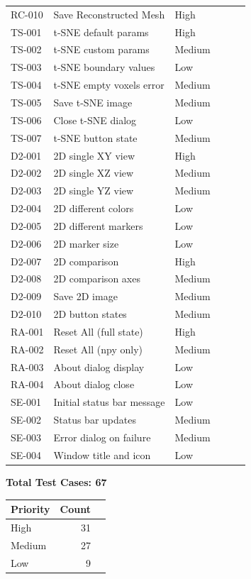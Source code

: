 \documentclass[12pt,a4paper]{article}
\begin{document}
\begin{longtable}{p{1.2cm}p{5.5cm}p{1.5cm}p{1.5cm}p{1.5cm}p{2cm}}
RC-010 & Save Reconstructed Mesh & High & & & \\
\addlinespace
TS-001 & t-SNE default params & High & & & \\
TS-002 & t-SNE custom params & Medium & & & \\
TS-003 & t-SNE boundary values & Low & & & \\
TS-004 & t-SNE empty voxels error & Medium & & & \\
TS-005 & Save t-SNE image & Medium & & & \\
TS-006 & Close t-SNE dialog & Low & & & \\
TS-007 & t-SNE button state & Medium & & & \\
\addlinespace
D2-001 & 2D single XY view & High & & & \\
D2-002 & 2D single XZ view & Medium & & & \\
D2-003 & 2D single YZ view & Medium & & & \\
D2-004 & 2D different colors & Low & & & \\
D2-005 & 2D different markers & Low & & & \\
D2-006 & 2D marker size & Low & & & \\
D2-007 & 2D comparison & High & & & \\
D2-008 & 2D comparison axes & Medium & & & \\
D2-009 & Save 2D image & Medium & & & \\
D2-010 & 2D button states & Medium & & & \\
\addlinespace
RA-001 & Reset All (full state) & High & & & \\
RA-002 & Reset All (npy only) & Medium & & & \\
RA-003 & About dialog display & Low & & & \\
RA-004 & About dialog close & Low & & & \\
\addlinespace
SE-001 & Initial status bar message & Low & & & \\
SE-002 & Status bar updates & Medium & & & \\
SE-003 & Error dialog on failure & Medium & & & \\
SE-004 & Window title and icon & Low & & & \\
\bottomrule
\end{longtable}

\vspace{1cm}
\begin{center}
\large\textbf{Total Test Cases: 67}
\end{center}

\vspace{0.5cm}
\begin{tabular}{lrr}
\toprule
\textbf{Priority} & \textbf{Count} \\
\midrule
High   & 31 \\
Medium & 27 \\
Low    & 9  \\
\bottomrule
\end{tabular}
\end{document}
